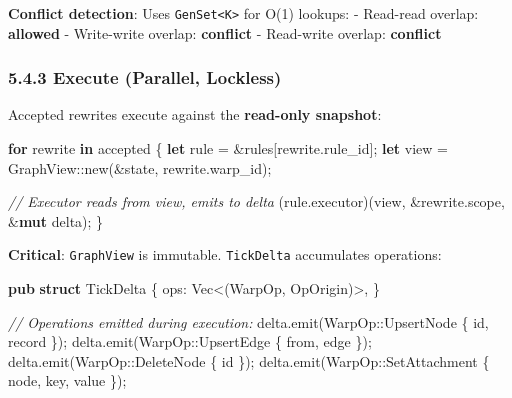 \documentclass[
  11pt,
]{book}
\newenvironment{Shaded}{}{}
\newcommand{\CommentTok}[1]{\textcolor[rgb]{0.38,0.63,0.69}{\textit{#1}}}
\newcommand{\ControlFlowTok}[1]{\textcolor[rgb]{0.00,0.44,0.13}{\textbf{#1}}}
\newcommand{\DataTypeTok}[1]{\textcolor[rgb]{0.56,0.13,0.00}{#1}}
\newcommand{\KeywordTok}[1]{\textcolor[rgb]{0.00,0.44,0.13}{\textbf{#1}}}
\newcommand{\NormalTok}[1]{#1}
\newcommand{\OperatorTok}[1]{\textcolor[rgb]{0.40,0.40,0.40}{#1}}
\newcommand{\PreprocessorTok}[1]{\textcolor[rgb]{0.74,0.48,0.00}{#1}}
\begin{document}
\textbf{Conflict detection}: Uses
\texttt{GenSet\textless{}K\textgreater{}} for O(1) lookups: - Read-read
overlap: \textbf{allowed} - Write-write overlap: \textbf{conflict} -
Read-write overlap: \textbf{conflict}

\subsubsection{5.4.3 Execute (Parallel,
Lockless)}\label{execute-parallel-lockless}

Accepted rewrites execute against the \textbf{read-only snapshot}:

\begin{Shaded}
\begin{Highlighting}[]
\ControlFlowTok{for}\NormalTok{ rewrite }\KeywordTok{in}\NormalTok{ accepted }\OperatorTok{\{}
    \KeywordTok{let}\NormalTok{ rule }\OperatorTok{=} \OperatorTok{\&}\NormalTok{rules[rewrite}\OperatorTok{.}\NormalTok{rule\_id]}\OperatorTok{;}
    \KeywordTok{let}\NormalTok{ view }\OperatorTok{=} \PreprocessorTok{GraphView::}\NormalTok{new(}\OperatorTok{\&}\NormalTok{state}\OperatorTok{,}\NormalTok{ rewrite}\OperatorTok{.}\NormalTok{warp\_id)}\OperatorTok{;}

    \CommentTok{// Executor reads from view, emits to delta}
\NormalTok{    (rule}\OperatorTok{.}\NormalTok{executor)(view}\OperatorTok{,} \OperatorTok{\&}\NormalTok{rewrite}\OperatorTok{.}\NormalTok{scope}\OperatorTok{,} \OperatorTok{\&}\KeywordTok{mut}\NormalTok{ delta)}\OperatorTok{;}
\OperatorTok{\}}
\end{Highlighting}
\end{Shaded}

\textbf{Critical}: \texttt{GraphView} is immutable. \texttt{TickDelta}
accumulates operations:

\begin{Shaded}
\begin{Highlighting}[]
\KeywordTok{pub} \KeywordTok{struct}\NormalTok{ TickDelta }\OperatorTok{\{}
\NormalTok{    ops}\OperatorTok{:} \DataTypeTok{Vec}\OperatorTok{\textless{}}\NormalTok{(WarpOp}\OperatorTok{,}\NormalTok{ OpOrigin)}\OperatorTok{\textgreater{},}
\OperatorTok{\}}

\CommentTok{// Operations emitted during execution:}
\NormalTok{delta}\OperatorTok{.}\NormalTok{emit(}\PreprocessorTok{WarpOp::}\NormalTok{UpsertNode }\OperatorTok{\{}\NormalTok{ id}\OperatorTok{,}\NormalTok{ record }\OperatorTok{\}}\NormalTok{)}\OperatorTok{;}
\NormalTok{delta}\OperatorTok{.}\NormalTok{emit(}\PreprocessorTok{WarpOp::}\NormalTok{UpsertEdge }\OperatorTok{\{}\NormalTok{ from}\OperatorTok{,}\NormalTok{ edge }\OperatorTok{\}}\NormalTok{)}\OperatorTok{;}
\NormalTok{delta}\OperatorTok{.}\NormalTok{emit(}\PreprocessorTok{WarpOp::}\NormalTok{DeleteNode }\OperatorTok{\{}\NormalTok{ id }\OperatorTok{\}}\NormalTok{)}\OperatorTok{;}
\NormalTok{delta}\OperatorTok{.}\NormalTok{emit(}\PreprocessorTok{WarpOp::}\NormalTok{SetAttachment }\OperatorTok{\{}\NormalTok{ node}\OperatorTok{,}\NormalTok{ key}\OperatorTok{,}\NormalTok{ value }\OperatorTok{\}}\NormalTok{)}\OperatorTok{;}
\end{Highlighting}
\end{Shaded}
\end{document}
